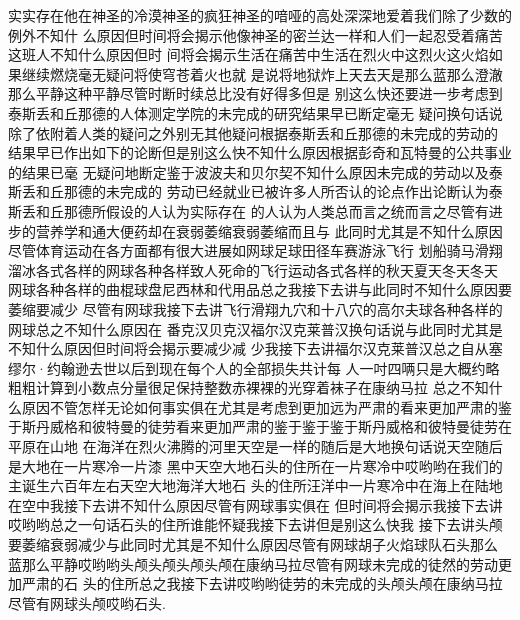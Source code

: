实实存在他在神圣的冷漠神圣的疯狂神圣的喑哑的高处深深地爱着我们除了少数的例外不知什
么原因但时间将会揭示他像神圣的密兰达一样和人们一起忍受着痛苦这班人不知什么原因但时
间将会揭示生活在痛苦中生活在烈火中这烈火这火焰如果继续燃烧毫无疑问将使穹苍着火也就
是说将地狱炸上天去天是那么蓝那么澄澈那么平静这种平静尽管时断时续总比没有好得多但是
别这么快还要进一步考虑到泰斯丢和丘那德的人体测定学院的未完成的研究结果早已断定毫无
疑问换句话说除了依附着人类的疑问之外别无其他疑问根据泰斯丢和丘那德的未完成的劳动的
结果早已作出如下的论断但是别这么快不知什么原因根据彭奇和瓦特曼的公共事业的结果已毫
无疑问地断定鉴于波波夫和贝尔契不知什么原因未完成的劳动以及泰斯丢和丘那德的未完成的
劳动已经就业已被许多人所否认的论点作出论断认为泰斯丢和丘那德所假设的人认为实际存在
的人认为人类总而言之统而言之尽管有进步的营养学和通大便药却在衰弱萎缩衰弱萎缩而且与
此同时尤其是不知什么原因尽管体育运动在各方面都有很大进展如网球足球田径车赛游泳飞行
划船骑马滑翔溜冰各式各样的网球各种各样致人死命的飞行运动各式各样的秋天夏天冬天冬天
网球各种各样的曲棍球盘尼西林和代用品总之我接下去讲与此同时不知什么原因要萎缩要减少
尽管有网球我接下去讲飞行滑翔九穴和十八穴的高尔夫球各种各样的网球总之不知什么原因在
番克汉贝克汉福尔汉克莱普汉换句话说与此同时尤其是不知什么原因但时间将会揭示要减少减
少我接下去讲福尔汉克莱普汉总之自从塞缪尔·约翰逊去世以后到现在每个人的全部损失共计每
人一吋四唡只是大概约略粗粗计算到小数点分量很足保持整数赤裸裸的光穿着袜子在康纳马拉
总之不知什么原因不管怎样无论如何事实俱在尤其是考虑到更加远为严肃的看来更加严肃的鉴
于斯丹威格和彼特曼的徒劳看来更加严肃的鉴于鉴于鉴于斯丹威格和彼特曼徒劳在平原在山地
在海洋在烈火沸腾的河里天空是一样的随后是大地换句话说天空随后是大地在一片寒冷一片漆
黑中天空大地石头的住所在一片寒冷中哎哟哟在我们的主诞生六百年左右天空大地海洋大地石
头的住所汪洋中一片寒冷中在海上在陆地在空中我接下去讲不知什么原因尽管有网球事实俱在
但时间将会揭示我接下去讲哎哟哟总之一句话石头的住所谁能怀疑我接下去讲但是别这么快我
接下去讲头颅要萎缩衰弱减少与此同时尤其是不知什么原因尽管有网球胡子火焰球队石头那么
蓝那么平静哎哟哟头颅头颅头颅头颅在康纳马拉尽管有网球未完成的徒然的劳动更加严肃的石
头的住所总之我接下去讲哎哟哟徒劳的未完成的头颅头颅在康纳马拉尽管有网球头颅哎哟石头.
